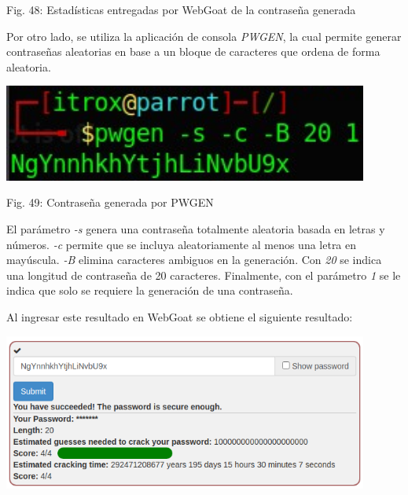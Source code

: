 \documentclass[12pt,oneside,a4paper]{book}
\begin{document}
\begin{enumerate}
\begin{enumerate}
\begin{center}
            \vspace{0.1em}
            
            Fig. 48: Estadísticas entregadas por WebGoat de la contraseña generada
        \end{center}
        
        \vspace{2em}
        
        \hspace{20pt}
        Por otro lado, se utiliza la aplicación de consola \textit{PWGEN}, la cual permite generar contraseñas aleatorias en base a un bloque de caracteres que ordena de forma aleatoria.

        \newpage
        
        \begin{center}
            \includegraphics[width=12cm]{img/PWGEN.png}
            
            \vspace{0.1em}
            
            Fig. 49: Contraseña generada por PWGEN
        \end{center}
        
        \vspace{2em}
        
        \hspace{20pt}
         El parámetro \textit{-s} genera una contraseña totalmente aleatoria basada en letras y números. \textit{-c} permite que se incluya aleatoriamente al menos una letra en mayúscula. \textit{-B} elimina caracteres ambiguos en la generación. Con \textit{20} se indica una longitud de contraseña de 20 caracteres. Finalmente, con el parámetro \textit{1} se le indica que solo se requiere la generación de una contraseña.
         
        \vspace{1em}
        
        Al ingresar este resultado en WebGoat se obtiene el siguiente resultado:

        \vspace{2em}
        
        \begin{center}
            \includegraphics[width=12cm]{img/8.png}
            

\end{center}
\end{enumerate}
\end{enumerate}
\end{document}
